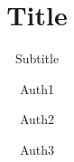 \documentclass{beamer}
\title{Title}
\subtitle{Subtitle}
\author{Auth1 \and Auth2 \and Auth3}
\date{}
\begin{document}
    \frame{\titlepage}
\end{document}
